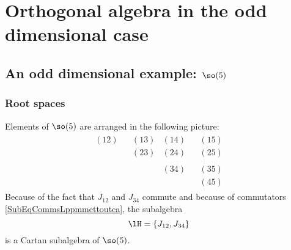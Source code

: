 \section{Orthogonal algebra in the odd dimensional case}

\subsection{An odd dimensional example: \texorpdfstring{$\so(5)$}{so5}}
\label{SubSecsocinq}

\subsubsection{Root spaces}

Elements of $\so(5)$ are arranged in the following picture:
\begin{equation}
	\begin{matrix}
		\begin{matrix}
			(12)\\\phantom{(12)}
		\end{matrix}
		&
		\boxed{
		\begin{matrix}
			(13)&(14)\\
			(23)&(24)
		\end{matrix}	
		}
		&
		\boxed{
		\begin{matrix}
			(15)\\
			(25)
		\end{matrix}	
		}
		\\
		\begin{matrix}
			\phantom{(12)}\\\phantom{(33)}
		\end{matrix}
		&
		\begin{matrix}
			\phantom{(12)}&(34)\\\phantom{(45)}
		\end{matrix}
		&
		\boxed{
		\begin{matrix}
			(35)\\
			(45)
		\end{matrix}	
		}
	\end{matrix}
\end{equation}
Because of the fact that $J_{12}$ and $J_{34}$ commute and because of commutators \eqref{SubEqCommsLppmmettoutca}, the subalgebra
\begin{equation}
	\lH=\{ J_{12},J_{34} \}
\end{equation}
is a Cartan subalgebra of $\so(5)$.

